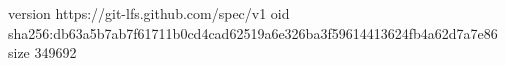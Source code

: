 version https://git-lfs.github.com/spec/v1
oid sha256:db63a5b7ab7f61711b0cd4cad62519a6e326ba3f59614413624fb4a62d7a7e86
size 349692
